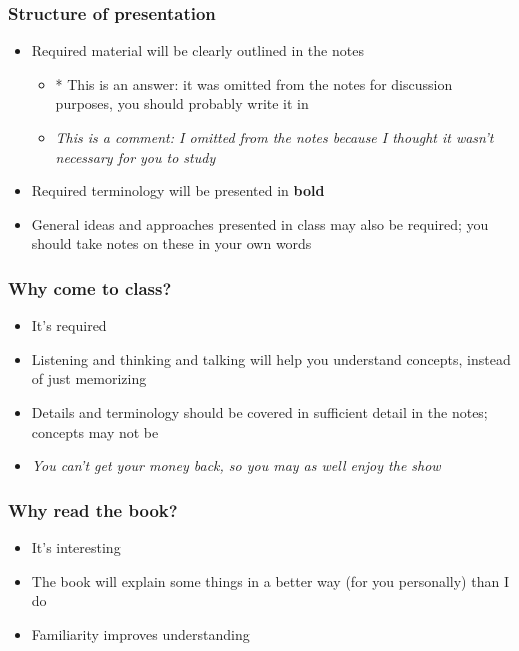 \documentclass{beamer}
\begin{document}
\begin{frame}


\frametitle{Structure of presentation}\begin{itemize}

\item Required material will be clearly outlined in the notes\begin{itemize}

\item * {\color{blue} This is an answer: it was omitted from the notes for
		discussion purposes, you should probably write it in}

\item {\color{green}\sl This is a comment: I omitted from the notes because I
		thought it wasn't necessary for you to study}\end{itemize}

\item Required terminology will be presented in {\bf bold}

\item General ideas and approaches presented in class may also be required;
	you should take notes on these in your own words\end{itemize}
\end{frame}

\begin{frame}


\frametitle{Why come to class?}\begin{itemize}

\item It's required

\item Listening and thinking and talking will help you understand
	concepts, instead of just memorizing

\item Details and terminology should be covered in sufficient detail in
	the notes; concepts may not be

\item {\color{green}\sl You can't get your money back, so you may as well enjoy
	the show}\end{itemize}
\end{frame}

\begin{frame}


\frametitle{Why read the book?}\begin{itemize}

\item It's interesting

\item The book will explain some things in a better way (for you
	personally) than I do

\item Familiarity improves understanding\end{itemize}
\end{frame}
\end{document}
